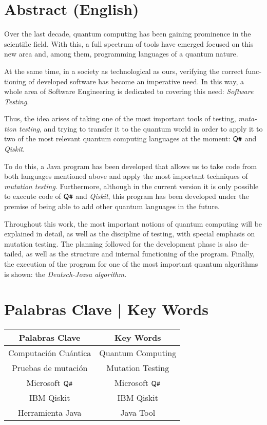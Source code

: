 \section{Abstract (English)}
\begin{otherlanguage}{british}
Over the last decade, quantum computing has been gaining prominence in the scientific field. With this, a full spectrum of tools have emerged focused on this new area and, among them, programming languages of a quantum nature.

At the same time, in a society as technological as ours, verifying the correct functioning of developed software has become an imperative need. In this way, a whole area of Software Engineering is dedicated to covering this need: \emph{Software Testing}.

Thus, the idea arises of taking one of the most important tools of testing, \textit{mutation testing}, and trying to transfer it to the quantum world in order to apply it to two of the most relevant quantum computing languages at the moment: $\textsf{Q}\texttt{\#}$ and \textit{Qiskit}.

To do this, a Java program has been developed that allows us to take code from both languages mentioned above and apply the most important techniques of \textit{mutation testing}. Furthermore, although in the current version it is only possible to execute code of $\textsf{Q}\texttt{\#}$ and \textit{Qiskit}, this program has been developed under the premise of being able to add other quantum languages in the future.

Throughout this work, the most important notions of quantum computing will be explained in detail, as well as the discipline of testing, with special emphasis on mutation testing. The planning followed for the development phase is also detailed, as well as the structure and internal functioning of the program. Finally, the execution of the program for one of the most important quantum algorithms is shown: the \textit{Deutsch-Jozsa algorithm.}
\end{otherlanguage}

\section{Palabras Clave | Key Words}

\begin{center}
\begin{tabular}{ |c|c| } 
 \hline
 Palabras Clave & Key Words \\
 \hline\hline 
 Computación Cuántica & Quantum Computing \\ 
 Pruebas de mutación  & Mutation Testing \\
 Microsoft $\textsf{Q}\texttt{\#}$     & Microsoft $\textsf{Q}\texttt{\#}$ \\
 IBM Qiskit  		  & IBM Qiskit \\
 Herramienta Java  	  & Java Tool \\ 
 \hline
\end{tabular}
\end{center}

